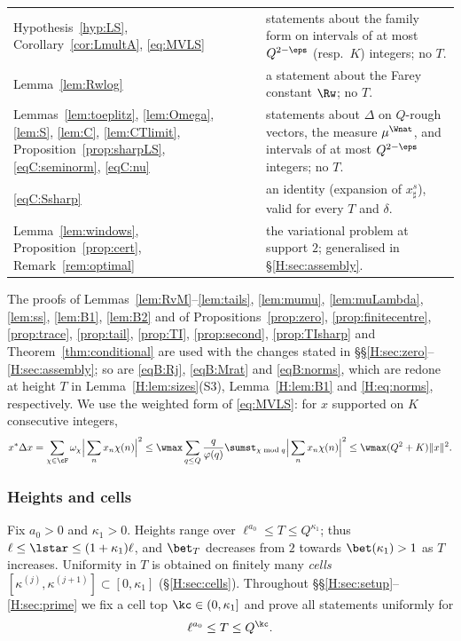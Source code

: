 \begin{center}
\begin{tabular}{@{}>{\raggedright\arraybackslash}p{5.4cm}>{\raggedright\arraybackslash}p{9.4cm}@{}}
Hypothesis~\ref{hyp:LS}, Corollary~\ref{cor:LmultA}, \eqref{eq:MVLS} & statements about the family form on intervals of at most $Q^{2-\eps}$ (resp.\ $K$) integers; no $T$.\\
Lemma~\ref{lem:Rwlog} & a statement about the Farey constant $\Rw$; no $T$.\\
Lemmas~\ref{lem:toeplitz}, \ref{lem:Omega}, \ref{lem:S}, \ref{lem:C}, \ref{lem:CTlimit}, Proposition~\ref{prop:sharpLS}, \eqref{eqC:seminorm}, \eqref{eqC:nu} & statements about $\Delta$ on $Q$-rough vectors, the measure $\mu^\Wnat$, and intervals of at most $Q^{2-\eps}$ integers; no $T$.\\
\eqref{eqC:Ssharp} & an identity (expansion of $x_\sharp^s$), valid for every $T$ and $\delta$.\\
Lemma~\ref{lem:windows}, Proposition~\ref{prop:cert}, Remark~\ref{rem:optimal} & the variational problem at support $2$; generalised in \S\ref{H:sec:assembly}.\\
\bottomrule
\end{tabular}
\end{center}
The proofs of Lemmas~\ref{lem:RvM}--\ref{lem:tails}, \ref{lem:mumu}, \ref{lem:muLambda}, \ref{lem:ss}, \ref{lem:B1}, \ref{lem:B2} and of Propositions~\ref{prop:zero}, \ref{prop:finitecentre}, \ref{prop:trace}, \ref{prop:tail}, \ref{prop:TI}, \ref{prop:second}, \ref{prop:TIsharp} and Theorem~\ref{thm:conditional} are used with the changes stated in \S\S\ref{H:sec:zero}--\ref{H:sec:assembly}; so are \eqref{eqB:Rj}, \eqref{eqB:Mrat} and \eqref{eqB:norms}, which are redone at height $T$ in Lemma~\ref{H:lem:sizes}(S3), Lemma~\ref{H:lem:B1} and \eqref{H:eq:norms}, respectively. We use the weighted form of \eqref{eq:MVLS}: for $x$ supported on $K$ consecutive integers,
\begin{equation}\label{H:eq:MVLSw}
x^*\Delta x=\sum_{\chi\in\cF}\omega_\chi\Big|\sum_nx_n\chi(n)\Big|^2\le\wmax\sum_{q\le Q}\frac q{\varphi(q)}\sumst_{\chi\bmod q}\Big|\sum_nx_n\chi(n)\Big|^2\le\wmax(Q^2+K)\|x\|^2 .
\end{equation}

\subsubsection*{Heights and cells}
Fix $a_0>0$ and $\kappa_1>0$. Heights range over $\ell^{a_0}\le T\le Q^{\kappa_1}$; thus $\ell\le\lstar\le(1+\kappa_1)\ell$, and $\bet_T$ decreases from $2$ towards $\bet(\kappa_1)>1$ as $T$ increases. Uniformity in $T$ is obtained on finitely many \emph{cells} $[\kappa^{(j)},\kappa^{(j+1)}]\subset[0,\kappa_1]$ (\S\ref{H:sec:cells}). Throughout \S\S\ref{H:sec:setup}--\ref{H:sec:prime} we fix a cell top $\kc\in(0,\kappa_1]$ and prove all statements uniformly for
\begin{equation}\label{H:eq:Trange}
\ell^{a_0}\le T\le Q^{\kc}.
\end{equation}

